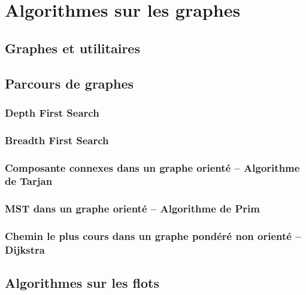 \section{Algorithmes sur les graphes}

\subsection{Graphes et utilitaires}


\subsection{Parcours de graphes}

\subsubsection{Depth First Search}
\subsubsection{Breadth First Search}

\subsubsection{Composante connexes dans un graphe orienté -- Algorithme de Tarjan}
\subsubsection{MST dans un graphe orienté -- Algorithme de Prim}
\subsubsection{Chemin le plus cours dans un graphe pondéré non orienté -- Dijkstra}


\subsection{Algorithmes sur les flots}
